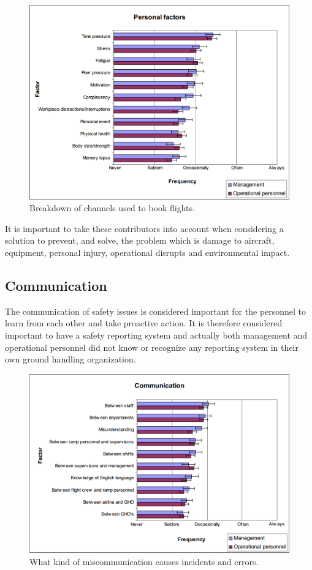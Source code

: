 \begin{figure}[H]
\centering
\includegraphics[width=\textwidth]{Grafik/PersonalFactors}
\caption{Breakdown of channels used to book flights.}
\label{PersonalFactors}
\end{figure}

It is important to take these contributors into account when considering a solution to prevent, and solve, the problem which is damage to aircraft, equipment, personal injury, operational disrupts and environmental impact.

\subsection{Communication}
The communication of safety issues is considered important for the personnel to learn from each other and take proactive action. It is therefore considered important to have a safety reporting system and actually both management and operational personnel did not know or recognize any reporting system in their own ground handling organization.

\begin{figure}[H]
\centering
\includegraphics[width=\textwidth]{Grafik/CommunicationalFactors}
\caption{What kind of miscommunication causes incidents and errors.}
\label{CommunicationalFactors}
\end{figure}

